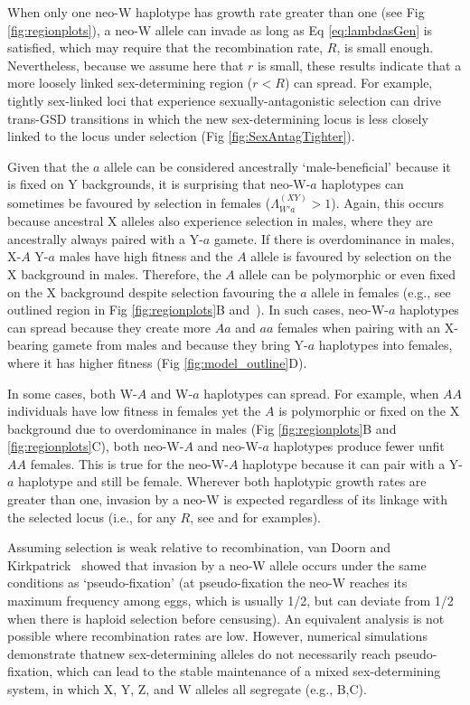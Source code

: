 \documentclass[10pt,letterpaper]{article}
\providecommand{\DIFaddtex}[1]{{\protect\color{blue}\uwave{#1}}} %
\providecommand{\DIFaddbegin}{} %
\providecommand{\DIFaddend}{} %
\providecommand{\DIFadd}[1]{\texorpdfstring{\DIFaddtex{#1}}{#1}} %
\begin{document}

When only one neo-W haplotype has growth rate greater than one (see Fig \ref{fig:regionplots}), a neo-W allele can invade as long as Eq \eqref{eq:lambdasGen} is satisfied, which may require that the recombination rate, $R$, is small enough.
Nevertheless, because we assume here that $r$ is small, these results indicate that a more loosely linked sex-determining region ($r<R$) can spread.
For example, tightly sex-linked loci that experience sexually-antagonistic selection can drive trans-GSD transitions in which the new sex-determining locus is less closely linked to the locus under selection (Fig \ref{fig:SexAntagTighter}). 

Given that the $a$ allele can be considered ancestrally `male-beneficial' because it is fixed on Y backgrounds, it is surprising that neo-W-$a$ haplotypes can sometimes be favoured by selection in females ($\Lambda_{W'a}^{(XY)}>1$). 
Again, this occurs because ancestral X alleles also experience selection in males, where they are ancestrally always paired with a Y-$a$ gamete. 
If there is overdominance in males, X-$A$ Y-$a$ males have high fitness and the $A$ allele is favoured by selection on the X background in males. 
Therefore, the $A$ allele can be polymorphic or even fixed on the X background despite selection favouring the $a$ allele in females (e.g., see outlined region in Fig \ref{fig:regionplots}B and~\cite{Lloyd1977,Otto2014}). 
In such cases, neo-W-$a$ haplotypes can spread because they create more $Aa$ and $aa$ females when pairing with an X-bearing gamete from males and because they bring Y-$a$ haplotypes into females, where it has higher fitness (Fig \ref{fig:model_outline}D). 

In some cases, both W-$A$ and W-$a$ haplotypes can spread.
For example, when $AA$ individuals have low fitness in females yet the $A$ is polymorphic or fixed on the X background due to overdominance in males (Fig \ref{fig:regionplots}B and \ref{fig:regionplots}C), both neo-W-$A$ and neo-W-$a$ haplotypes produce fewer unfit $AA$ females.
This is true for the neo-W-$A$ haplotype because it can pair with a Y-$a$ haplotype and still be female. 
Wherever both haplotypic growth rates are greater than one, invasion by a neo-W is expected regardless of its linkage with the selected locus (i.e., for any $R$, see  and  for examples). 

Assuming selection is weak relative to recombination, van Doorn and Kirkpatrick~\cite{vanDoorn:2010hu} showed that invasion by a neo-W allele occurs under the same conditions as `pseudo-fixation' (at pseudo-fixation the neo-W reaches its maximum frequency among eggs, which is usually 1/2, but can deviate from 1/2 when there is haploid selection before censusing). 
An equivalent analysis is not possible where recombination rates are low. 
However, numerical simulations demonstrate that\DIFaddbegin \DIFadd{, with tight sex linkage, }\DIFaddend new sex-determining alleles do not necessarily reach pseudo-fixation, which can lead to the stable maintenance of a mixed sex-determining system, in which X, Y, Z, and W alleles all segregate (e.g., B,C). 
\end{document}
